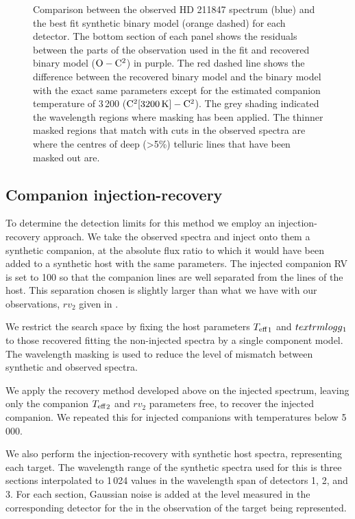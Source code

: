 \begin{figure*}
    \centering
    \caption{Comparison between the observed {HD 211847} spectrum (blue) and the best fit synthetic binary model (orange dashed) for each detector. The bottom section of each panel shows the residuals between the parts of the observation used in the \textchisquared{} fit and recovered binary model (\(\rm O-C^2\)) in purple. The red dashed line shows the difference between the recovered binary model and the binary model with the exact same parameters except for the estimated companion temperature of 3\,200\K{} (\(\rm C^2[3200\,\si{\kelvin}{}]- C^2\)). The grey shading indicated the wavelength regions where masking has been applied. The thinner masked regions that match with cuts in the observed spectra are where the centres of deep (>5\%) telluric lines that have been masked out are.}
    \label{fig:visualinspection-hd2118471}
\end{figure*}


\subsection{Companion injection-recovery}
\label{subsection:injection-recovery}
To determine the detection limits for this method we employ an injection-recovery approach. We take the observed spectra and inject onto them a synthetic companion, at the absolute flux ratio to which it would have been added to a synthetic host with the same parameters. The injected companion {RV} is set to 100\kmps{} so that the companion lines are well separated from the lines of the host. This separation chosen is slightly larger than what we have with our observations, \(rv_2\) given in .

We restrict the search space by fixing the host parameters \({T_{\mathrm{eff}}}_{1}\) and \(textrm{logg}{}_1\) to those recovered fitting the non-injected spectra by a single component model. The wavelength masking is used to reduce the level of mismatch between synthetic and observed spectra.

We apply the recovery method developed above on the injected spectrum, leaving only the companion \({T_{\mathrm{eff}}}_{2}\) and \({rv}_2\) parameters free, to recover the injected companion. We repeated this for injected companions with temperatures below 5\,000\K{}.

We also perform the injection-recovery with synthetic host spectra, representing each target. The wavelength range of the synthetic spectra used for this is three sections interpolated to 1\,024 values in the wavelength span of detectors 1, 2, and 3. For each section, Gaussian noise is added at the level measured in the corresponding detector for the in the observation of the target being represented.


